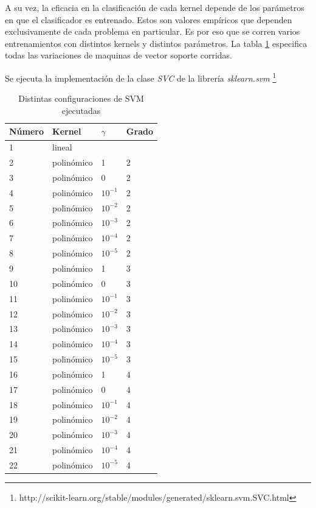 \documentclass[journal]{IEEEtran}
\begin{document}
A su vez, la eficacia en la clasificación de cada kernel depende de los
parámetros en que el clasificador es entrenado. Estos son valores empíricos
que dependen exclusivamente de cada problema en particular. Es por eso
que se corren varios entrenamientos con distintos kernels y distintos parámetros.
La tabla \ref{table:svm_config} especifica todas las variaciones de maquinas 
de vector soporte corridas.

Se ejecuta la implementación de la clase \textit{SVC} de la librería 
\textit{sklearn.svm}
\footnote{http://scikit-learn.org/stable/modules/generated/sklearn.svm.SVC.html}

\begin{table}[ht!]
\caption{Distintas configuraciones de SVM ejecutadas}
\label{table:svm_config}
\centering
\begin{tabular}{l | l l l }
Número & Kernel & $\gamma$ & Grado  \\
\hline
1 & lineal &  &  \\ 
2 & polinómico & 1  & 2 \\ 
3  & polinómico & 0  & 2 \\ 
4  & polinómico & $ 10^{-1} $  & 2 \\ 
5  & polinómico & $ 10^{-2} $  & 2 \\ 
6  & polinómico & $ 10^{-3} $  & 2 \\ 
7  & polinómico & $ 10^{-4} $  & 2 \\ 
8  & polinómico & $ 10^{-5} $  & 2 \\ 
9  & polinómico & 1  & 3 \\ 
10 & polinómico & 0  & 3 \\ 
11 & polinómico & $ 10^{-1} $  & 3 \\ 
12 & polinómico & $ 10^{-2} $  & 3 \\ 
13 & polinómico & $ 10^{-3} $  & 3 \\ 
14 & polinómico & $ 10^{-4} $  & 3 \\ 
15 & polinómico & $ 10^{-5} $  & 3 \\ 
16 & polinómico & 1  & 4 \\ 
17 & polinómico & 0  & 4 \\ 
18 & polinómico & $ 10^{-1} $  & 4 \\ 
19 & polinómico & $ 10^{-2} $  & 4 \\ 
20 & polinómico & $ 10^{-3} $  & 4 \\ 
21 & polinómico & $ 10^{-4} $  & 4 \\ 
22 & polinómico & $ 10^{-5} $  & 4 \\ 

\end{tabular}
\end{table}
\end{document}
